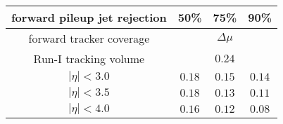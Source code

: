\begin{tabular}{c|c|c|c}
      forward pileup jet rejection & \multicolumn{1}{c}{50\%} & \multicolumn{1}{c}{75\%}   & \multicolumn{1}{c}{90\%} \\
      \hline \hline
      forward tracker coverage     & \multicolumn{3}{c}{$\Delta\mu$} \\
      \hline
      Run-I tracking volume        & \multicolumn{1}{c}{}     & \multicolumn{1}{c}{$0.24$} & \multicolumn{1}{c}{} \\
      $|\eta| < 3.0$               & $0.18$                   & $0.15$                     & $0.14$ \\
      $|\eta| < 3.5$               & $0.18$                   & $0.13$                     & $0.11$ \\
      $|\eta| < 4.0$               & $0.16$                   & $0.12$                     & $0.08$ \\
\end{tabular}

